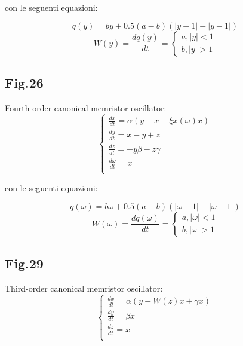 \documentclass[12pt, a4paper]{book}
\begin{document}
con le seguenti equazioni:

\begin{equation}
q(y)=by+0.5(a-b)(|y+1|-|y-1|)
\end{equation}
\begin{equation}
W(y)=\frac{dq(y)}{dt}=
\begin{cases}
a, |y|<1
\\
b, |y|>1
\end{cases}
\end{equation}

\subsection{Fig.26}
Fourth-order canonical memristor oscillator:
\begin{equation}
\begin{cases}
\frac{dx}{dt}=\alpha(y-x+\xi x(\omega)x)
\\
\frac{dy}{dt}=x-y+z
\\
\frac{dz}{dt}=-y\beta-z\gamma
\\
\frac{d\omega}{dt}=x
\\
\end{cases}
\end{equation}

con le seguenti equazioni:

\begin{equation}
q(\omega)=b\omega+0.5(a-b)(|\omega+1|-|\omega-1|)
\end{equation}
\begin{equation}
W(\omega)=\frac{dq(\omega)}{dt}=
\begin{cases}
a, |\omega|<1
\\
b, |\omega|>1
\end{cases}
\end{equation}

\subsection{Fig.29}
Third-order canonical memristor oscillator:
\begin{equation}
\begin{cases}
\frac{dx}{dt}=\alpha(y-W(z)x+\gamma x)
\\
\frac{dy}{dt}=\beta x
\\
\frac{dz}{dt}=x
\\
\end{cases}
\end{equation}
\end{document}
